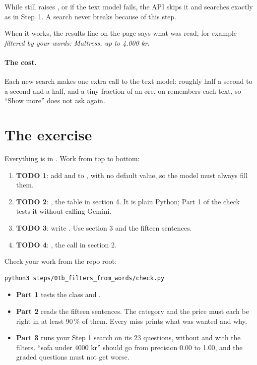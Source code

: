 \documentclass[11pt]{article}
\begin{document}
While  still raises , or if
the text model fails, the API skips it and searches exactly as in
Step~1. A search never breaks because of this step.

When it works, the results line on the page says what was read, for
example \emph{filtered by your words: Mattress, up to 4.000 kr.}

\paragraph{The cost.} Each new search makes one extra call to the text
model: roughly half a second to a second and a half, and a tiny
fraction of an øre.  on 
remembers each text, so ``Show more'' does not ask again.

\section{The exercise}

Everything is in . Work from top to bottom:

\begin{enumerate}[leftmargin=1.4em, itemsep=3pt]
\item \textbf{TODO 1}: add  and  to
  , with no default value, so the model must always
  fill them.
\item \textbf{TODO 2}: , the table in section 4.
  It is plain Python; Part 1 of the check tests it without calling
  Gemini.
\item \textbf{TODO 3}: write . Use section 3 and the
  fifteen sentences.
\item \textbf{TODO 4}: , the call in section 2.
\end{enumerate}

Check your work from the repo root:
\begin{lstlisting}
python3 steps/01b_filters_from_words/check.py
\end{lstlisting}
\begin{itemize}[leftmargin=1.4em, itemsep=2pt]
\item \textbf{Part 1} tests the class and .
\item \textbf{Part 2} reads the fifteen sentences. The category and the
  price must each be right in at least 90\,\% of them. Every miss
  prints what was wanted and why.
\item \textbf{Part 3} runs your Step 1 search on its 23 questions,
  without and with the filters. ``sofa under 4000 kr'' should go from
  precision 0.00 to 1.00, and the graded questions must not get worse.
\end{itemize}
\end{document}
